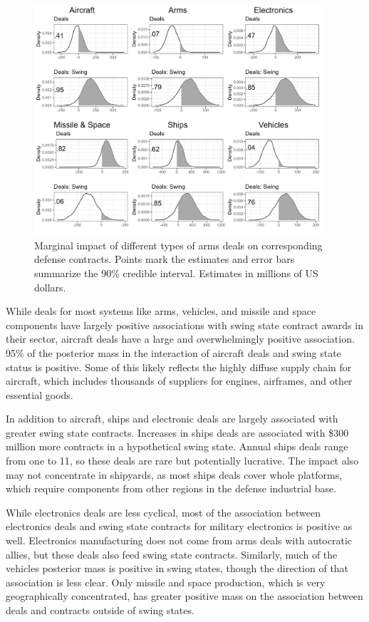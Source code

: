 \documentclass[12pt]{article}
\begin{document}
\begin{figure}[htpb]
	\centering
		\includegraphics[width=0.95\textwidth]{../figures/me-deals-sector.png}
	\caption{Marginal impact of different types of arms deals on corresponding defense contracts. Points mark the estimates and error bars summarize the 90\% credible interval. Estimates in millions of US dollars.}
	\label{fig:me-deals-sector}
\end{figure}


While deals for most systems like arms, vehicles, and missile and space components have largely positive associations with swing state contract awards in their sector, aircraft deals have a large and overwhelmingly positive association. 
95\% of the posterior mass in the interaction of aircraft deals and swing state status is positive.
Some of this likely reflects the highly diffuse supply chain for aircraft, which includes thousands of suppliers for engines, airframes, and other essential goods. 


In addition to aircraft, ships and electronic deals are largely associated with greater swing state contracts. 
Increases in ships deals are associated with \$300 million more contracts in a hypothetical swing state. 
Annual ships deals range from one to 11, so these deals are rare but potentially lucrative. 
The impact also may not concentrate in shipyards, as most ships deals cover whole platforms, which require components from other regions in the defense industrial base. 

 
While electronics deals are less cyclical, most of the association between electronics deals and swing state contracts for military electronics is positive as well.
Electronics manufacturing does not come from arms deals with autocratic allies, but these deals also feed swing state contracts. 
Similarly, much of the vehicles posterior mass is positive in swing states, though the direction of that association is less clear. 
Only missile and space production, which is very geographically concentrated, has greater positive mass on the association between deals and contracts outside of swing states.
\end{document}

